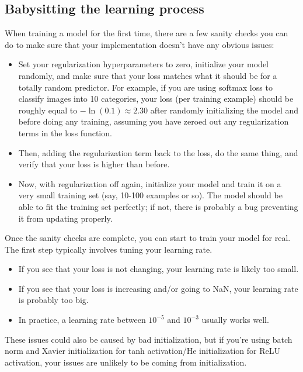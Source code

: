 \subsection{Babysitting the learning process}
When training a model for the first time, there are a few sanity checks you can do to make sure that your implementation doesn't have any obvious issues:
\begin{itemize}
\item Set your regularization hyperparameters to zero, initialize your model randomly, and make sure that your loss matches what it should be for a totally random predictor. For example, if you are using softmax loss to classify images into 10 categories, your loss (per training example) should be roughly equal to $-\ln(0.1) \approx 2.30$ after randomly initializing the model and before doing any training, assuming you have zeroed out any regularization terms in the loss function.
\item Then, adding the regularization term back to the loss, do the same thing, and verify that your loss is higher than before.
\item Now, with regularization off again, initialize your model and train it on a very small training set (say, 10-100 examples or so). The model should be able to fit the training set perfectly; if not, there is probably a bug preventing it from updating properly.
\end{itemize}
Once the sanity checks are complete, you can start to train your model for real. The first step typically involves tuning your learning rate. 
\begin{itemize}
\item If you see that your loss is not changing, your learning rate is likely too small.
\item If you see that your loss is increasing and/or going to NaN, your learning rate is probably too big.
\item In practice, a learning rate between $10^{-5}$ and $10^{-3}$ usually works well.
\end{itemize}
These issues could also be caused by bad initialization, but if you're using batch norm and Xavier initialization for tanh activation/He initialization for ReLU activation, your issues are unlikely to be coming from initialization.

